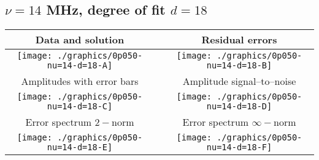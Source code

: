 

% 

\clearpage{}
\break{}

\subsection{$\nu = 14$ MHz, degree of fit $d = 18$}

\begin{table}[h]
    \begin{center}
        \begin{tabular}{ccc}
            Data and solution & \quad & Residual errors \\\hline
            \texttt{[image: ./graphics/0p050-nu=14-d=18-A]} &&
            \texttt{[image: ./graphics/0p050-nu=14-d=18-B]} \\[15pt]
            Amplitudes with error bars && Amplitude signal--to--noise \\\hline
            \texttt{[image: ./graphics/0p050-nu=14-d=18-C]} &&
            \texttt{[image: ./graphics/0p050-nu=14-d=18-D]} \\[15pt]
            Error spectrum $2-$norm && Error spectrum $\infty-$norm \\\hline
            \texttt{[image: ./graphics/0p050-nu=14-d=18-E]} &&
            \texttt{[image: ./graphics/0p050-nu=14-d=18-F]} \\[15pt]
        \end{tabular}
    \end{center}
\label{fig:elev=50, nu=14}
\end{table}



\endinput
